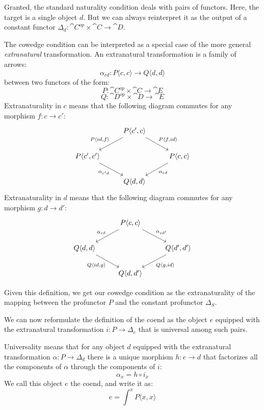 \documentclass[DaoFP]{subfiles}
\begin{document}
Granted, the standard naturality condition deals with pairs of functors. Here, the target is a single object $d$. But we can always reinterpret it as the output of a constant functor $\Delta_d \colon \cat C^{op} \times \cat C \to \cat D$.

The cowedge condition can be interpreted as a special case of the more general \emph{extranatural} transformation. An extranatural transformation is a family of arrows:
\[ \alpha_{c d} \colon P \langle c, c \rangle \to Q \langle d, d \rangle \]
between two functors of the form:
\[ P \colon \cat C^{op} \times \cat C \to \cat E \]
\[ Q \colon \cat D^{op} \times \cat D \to \cat E \]
Extranaturality in $c$ means that the following diagram commutes for any morphism $f \colon c \to c'$:
\[
 \begin{tikzcd}
 &P \langle c', c \rangle
 \arrow[ld, "{P \langle id, f \rangle}"']
 \arrow[rd, "{P \langle f, id \rangle}"]
 \\
      P \langle c', c' \rangle
 \arrow[dr, "\alpha_{c' d}"']
 &&P \langle c, c \rangle
 \arrow[dl, "\alpha_{c d}"]
 \\
 & Q \langle d, d \rangle
 \end{tikzcd}
\]
Extranaturality in $d$ means that the following diagram commutes for any morphism $g \colon d \to d'$:
\[
 \begin{tikzcd}
 &P \langle c, c \rangle
 \arrow[ld, "\alpha_{c d}"']
 \arrow[rd, "\alpha_{c d'}"]
 \\
      Q \langle d, d \rangle
 \arrow[dr, "{Q \langle id, g\rangle}"']
 &&Q \langle d', d' \rangle
 \arrow[dl, "{Q \langle g,  id\rangle}"]
 \\
 & Q \langle d, d' \rangle
 \end{tikzcd}
\]

Given this definition, we get our cowedge condition as the extranaturality of the mapping between the profunctor $P$ and the constant profunctor $\Delta_S$. 

We can now reformulate the definition of the coend as the object $e$ equipped with the extranatural transformation  $i \colon P \to \Delta_e$ that is universal among such pairs.

Universality means that for any object $d$ equipped with the extranatural transformation $\alpha \colon P \to \Delta_d$ there is a unique morphism $h \colon e \to d$ that factorizes all the components of $\alpha$ through the components of $i$:
\[ \alpha_x = h \circ i_x \]
We call this object $e$ the coend, and write it as:
\[ e = \int^x P\langle x, x \rangle \]
\end{document}
